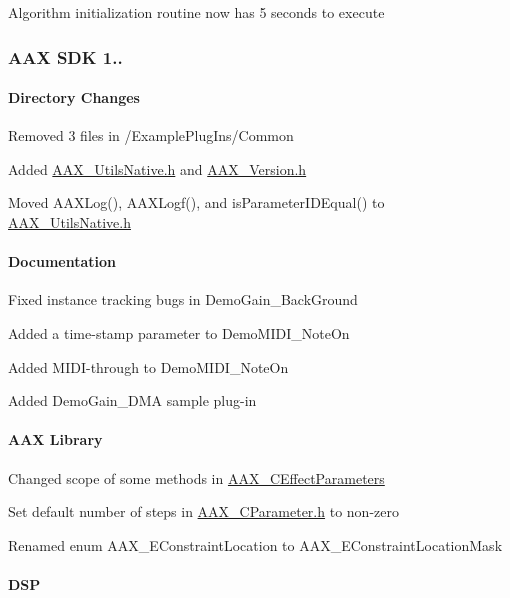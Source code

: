 \begin{DoxyItemize}
\item Algorithm initialization routine now has 5 seconds to execute 
\end{DoxyItemize}\hypertarget{a00375_aax_sdk_1p0p5}{}\subsubsection{A\+A\+X S\+D\+K 1..}\label{a00375_aax_sdk_1p0p5}
\hypertarget{a00375_aax_sdk_1p0p5_DirectoryChanges}{}\paragraph{Directory Changes}\label{a00375_aax_sdk_1p0p5_DirectoryChanges}

\begin{DoxyItemize}
\item Removed 3 files in /\+Example\+Plug\+Ins/\+Common 
\item Added \hyperlink{a00300}{A\+A\+X\+\_\+\+Utils\+Native.\+h} and \hyperlink{a00308}{A\+A\+X\+\_\+\+Version.\+h} 
\item Moved A\+A\+X\+Log(), A\+A\+X\+Logf(), and is\+Parameter\+I\+D\+Equal() to \hyperlink{a00300}{A\+A\+X\+\_\+\+Utils\+Native.\+h} 
\end{DoxyItemize}\hypertarget{a00375_aax_sdk_1p0p5_Documentation}{}\paragraph{Documentation}\label{a00375_aax_sdk_1p0p5_Documentation}

\begin{DoxyItemize}
\item Fixed instance tracking bugs in Demo\+Gain\+\_\+\+Back\+Ground 
\item Added a time-\/stamp parameter to Demo\+M\+I\+D\+I\+\_\+\+Note\+On 
\item Added M\+I\+D\+I-\/through to Demo\+M\+I\+D\+I\+\_\+\+Note\+On 
\item Added Demo\+Gain\+\_\+\+D\+M\+A sample plug-\/in 
\end{DoxyItemize}\hypertarget{a00375_aax_sdk_1p0p5_AAXLibrary}{}\paragraph{A\+A\+X Library}\label{a00375_aax_sdk_1p0p5_AAXLibrary}

\begin{DoxyItemize}
\item Changed scope of some methods in \hyperlink{a00018}{A\+A\+X\+\_\+\+C\+Effect\+Parameters} 
\item Set default number of steps in \hyperlink{a00190}{A\+A\+X\+\_\+\+C\+Parameter.\+h} to non-\/zero 
\item Renamed enum A\+A\+X\+\_\+\+E\+Constraint\+Location to A\+A\+X\+\_\+\+E\+Constraint\+Location\+Mask 
\end{DoxyItemize}\hypertarget{a00375_aax_sdk_1p0p5_DSP}{}\paragraph{D\+S\+P}\label{a00375_aax_sdk_1p0p5_DSP}

